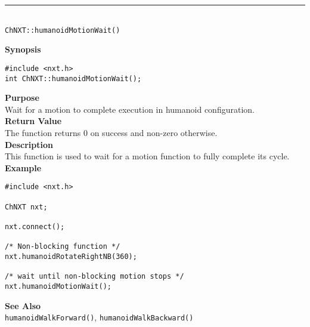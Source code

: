 \noindent
\vspace{5pt}
\rule{4.5in}{0.015in}\\
\noindent
{\LARGE \texttt{ChNXT::humanoidMotionWait()}}\\
{}

\noindent
{\bf Synopsis}
\begin{lstlisting}
#include <nxt.h>
int ChNXT::humanoidMotionWait();
\end{lstlisting}

\noindent
{\bf Purpose}\\
Wait for a motion to complete execution in humanoid configuration.\\

\noindent
{\bf Return Value}\\
The function returns 0 on success and non-zero otherwise.\\

\noindent
{\bf Description}\\
This function is used to wait for a motion function to fully complete its cycle.\\


\noindent
{\bf Example}
\begin{lstlisting}
#include <nxt.h>

ChNXT nxt;

nxt.connect();

/* Non-blocking function */
nxt.humanoidRotateRightNB(360);

/* wait until non-blocking motion stops */
nxt.humanoidMotionWait();
\end{lstlisting}

\noindent
{\bf See Also}\\
\texttt{humanoidWalkForward()}, \texttt{humanoidWalkBackward()}



